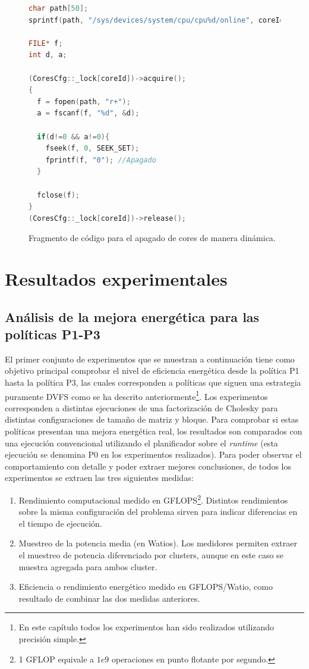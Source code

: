 \begin{figure}
  \centering
\begin{lstlisting}[language=C++]
char path[50];
sprintf(path, "/sys/devices/system/cpu/cpu%d/online", coreId);

FILE* f;
int d, a;

(CoresCfg::_lock[coreId])->acquire();
{
  f = fopen(path, "r+");
  a = fscanf(f, "%d", &d);
	
  if(d!=0 && a!=0){
    fseek(f, 0, SEEK_SET);
    fprintf(f, "0"); //Apagado
  }
	
  fclose(f);
}
(CoresCfg::_lock[coreId])->release();
\end{lstlisting}
  \caption{Fragmento de código para el apagado de cores de manera
    dinámica.}
  \label{fig:lst:apagado-cores}
\end{figure}





\section{Resultados experimentales}

\subsection{Análisis de la mejora energética para las políticas P1-P3}

El primer conjunto de experimentos que se muestran a continuación tiene
como objetivo principal comprobar el nivel de eficiencia energética desde
la política P1 hasta la política P3, las cuales corresponden a políticas
que siguen una estrategia puramente DVFS como se ha descrito
anteriormente\footnote{En este capítulo todos los experimentos han sido
  realizados utilizando precisión simple.}. Los experimentos corresponden a
distintas ejecuciones de una factorización de Cholesky para distintas
configuraciones de tamaño de matriz y bloque. Para comprobar si estas
políticas presentan una mejora energética real, los resultados son
comparados con una ejecución convencional utilizando el planificador \botlev sobre
el \emph{runtime} \ompss (esta ejecución se denomina P0 en los experimentos
realizados). Para poder observar el comportamiento con detalle y poder
extraer mejores conclusiones, de todos los experimentos se extraen las tres
siguientes medidas:
\begin{enumerate}
\item Rendimiento computacional medido en GFLOPS\footnote{1 GFLOP equivale a $1e9$ operaciones en 
		punto flotante por segundo.}. Distintos rendimientos
  sobre la misma configuración del problema sirven para indicar
  diferencias en el tiempo de ejecución.

\item Muestreo de la potencia media (en Watios). Los medidores
  permiten extraer el muestreo de potencia diferenciado por clusters, aunque
		en este caso se muestra agregada para ambos cluster.

\item Eficiencia o rendimiento energético medido en GFLOPS/Watio, como resultado de
  combinar las dos medidas anteriores.
\end{enumerate}

